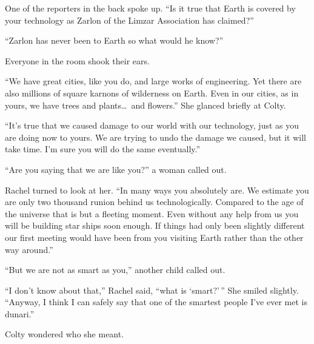 One of the reporters in the back spoke up. ``Is it true that Earth is covered by your technology
as Zarlon of the Limzar Association has claimed?''

``Zarlon has never been to Earth so what would he know?''

Everyone in the room shook their ears.

``We have great cities, like you do, and large works of engineering. Yet there are also millions
of square karnons of wilderness on Earth. Even in our cities, as in yours, we have trees and
plants\ldots\ and flowers.'' She glanced briefly at Colty.

``It's true that we caused damage to our world with our technology, just as you are doing now to
yours. We are trying to undo the damage we caused, but it will take time. I'm sure you will do
the same eventually.''

``Are you saying that we are like you?'' a woman called out.

Rachel turned to look at her. ``In many ways you absolutely are. We estimate you are only two
thousand runion behind us technologically. Compared to the age of the universe that is but a
fleeting moment. Even without any help from us you will be building star ships soon enough. If
things had only been slightly different our first meeting would have been from you visiting
Earth rather than the other way around.''

``But we are not as smart as you,'' another child called out.

``I don't know about that,'' Rachel said, ``what is `smart?'\,'' She smiled slightly.
``Anyway, I think I can safely say that one of the smartest people I've ever met is dunari.''

Colty wondered who she meant.
